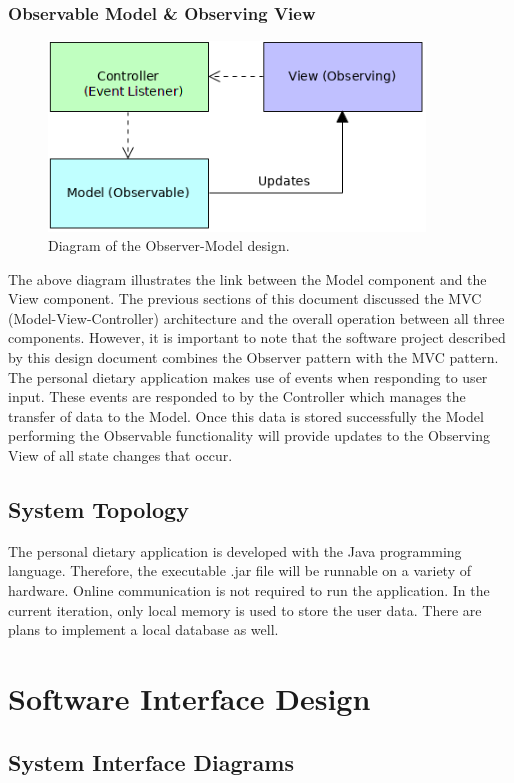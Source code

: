 \documentclass{scrreprt}
\begin{document}
\subsection{Observable Model \& Observing View}

\begin{figure}[ht]
\includegraphics[width=10cm]{pictures/obsv2.png}
\caption{Diagram of the Observer-Model design.}
\end{figure}

The above diagram illustrates the link between the Model component and the View component. The previous sections of this document discussed the MVC (Model-View-Controller) architecture and the overall operation between all three components. However, it is important to note that the software project described by this design document combines the Observer pattern with the MVC pattern. The personal dietary application makes use of events when responding to user input. These events are responded to by the Controller which manages the transfer of data to the Model. Once this data is stored successfully the Model performing the Observable functionality will provide updates to the Observing View of all state changes that occur.

\section{System Topology}

The personal dietary application is developed with the Java programming language. Therefore, the executable .jar file will be runnable on a variety of hardware. Online communication is not required to run the application. In the current iteration, only local memory is used to store the user data. There are plans to implement a local database as well.

\chapter{Software Interface Design}
\section{System Interface Diagrams}
\end{document}
